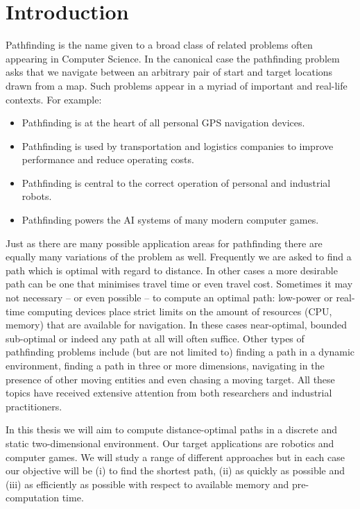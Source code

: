 \chapter{Introduction}
\label{cha::intro}

Pathfinding is the name given to a broad class of related problems
often appearing in Computer Science. In the canonical case the
pathfinding problem asks that we navigate between an arbitrary pair of 
start and target locations drawn from a map. Such problems
appear in a myriad of important and real-life contexts. For example:
\begin{itemize}
\item Pathfinding is at the heart of all personal GPS navigation devices.
\item Pathfinding is used by transportation and logistics companies to 
improve performance and reduce operating costs.
\item Pathfinding is central to the correct operation of personal and industrial robots.
\item Pathfinding powers the AI systems of many modern computer games.
\end{itemize}

\noindent Just as there are many possible application areas for pathfinding there are
equally many variations of the problem as well. Frequently we are
asked to find a path which is optimal with regard to distance. In other cases
a more desirable path can be one that minimises travel time or even travel
cost.  Sometimes it may not necessary -- or even possible -- to compute an
optimal path: low-power or real-time computing devices place
strict limits on the amount of resources (CPU, memory) that are available for
navigation.  In these cases near-optimal, bounded sub-optimal or indeed any
path at all will often suffice. Other types of pathfinding problems include
(but are not limited to) finding a path in a dynamic environment, finding a path 
in three or more dimensions, navigating in the presence of other moving entities and
even chasing a moving target. All these topics have received 
extensive attention from both researchers and industrial practitioners.

In this thesis we will aim to compute distance-optimal paths in a discrete
and static two-dimensional environment. Our target applications are robotics and computer games.
We will study a range of different approaches but in each case our objective will
be (i) to find the shortest path, (ii) as quickly as possible and (iii) as efficiently
as possible with respect to available memory and pre-computation time. 

